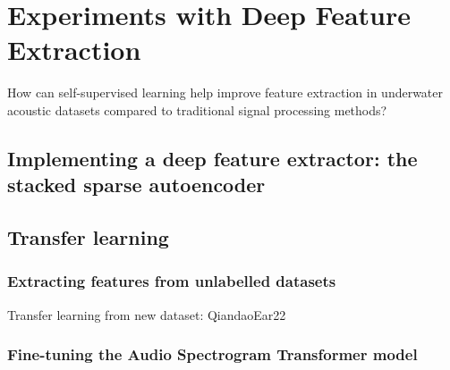 \chapter{Experiments with Deep Feature Extraction}

\begin{researchquestion}
How can self-supervised learning help improve feature extraction in underwater acoustic datasets compared to traditional signal processing methods?
\end{researchquestion}

\section{Implementing a deep feature extractor: the stacked sparse autoencoder}

\section{Transfer learning}

\subsection{Extracting features from unlabelled datasets}

Transfer learning from new dataset: QiandaoEar22

\subsection{Fine-tuning the Audio Spectrogram Transformer model}


